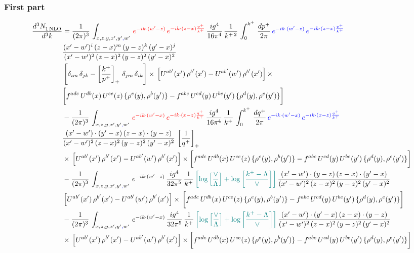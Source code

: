 \documentclass[9pt]{article}
\numberwithin{equation}{section}
\begin{document}
\subsubsection*{First part}
\begin{align}
     \frac{d^{3}N_{1\,\rm NLO}^{\rm}}{d^{3}k}  & = \frac{1}{(2\pi)^{3}}\, \int_{x,z,y,x',y'{\color{blue},}w'}\,{\color{red}e^{-ik\cdot (w^\prime-z)}\,e^{-ik\cdot (z-x)\frac{p^{+}}{k^{+}}}}\,\frac{ig^{4}}{16\pi^{4}}\, \frac{1}{k^{+\,2}}\,\int_{0}^{k^{+}}\, \frac{dp^{+}}{2\pi}\,{\color{blue}e^{-ik\cdot (w^\prime-z)}\,e^{-ik\cdot (z-x)\frac{p^{+}}{k^{+}}}}\notag \\ & \frac{(x'-w')^{i}\,(z-x)^{m}\,(y-z)^{k}\,(y'-x)^{j}}{(x'-w')^{2}\,(z-x)^{2}\,(y-z)^{2}\,(y'-x)^{2}}\,\notag \\ & \left[\delta_{im}\,\delta_{jk}-\left[\frac{k^{+}}{p^{+}}\right]_{+}\, \delta_{jm}\,\delta_{ik}\right]\times\, \left[U^{ab'}(x')\,\rho^{b'}(x')-U^{ab'}(w')\,\rho^{b'}(x')\right]\times\notag \\ & \bigg[f^{adc}\,U^{db}(x)\,U^{ce}(z)\, \{\rho^{e}(y),\rho^{b}(y')\}-f^{abc}\,U^{cd}(y)\,U^{be}(y')\, \{\rho^{d}(y),\rho^{e}(y')\}\bigg]\notag \\ & -\frac{1}{(2\pi)^{3}}\, \int_{x,z,y,x',y'{\color{blue},}w'}\,{\color{red}e^{-ik\cdot (w^\prime-x)}\,e^{-ik\cdot (x-z)\frac{q^{+}}{k^{+}}}}\,\frac{ig^{4}}{16\pi^{4}}\, \frac{1}{k^{+}}\,\int_{0}^{k^{+}}\, \frac{dq^{+}}{2\pi}\,{\color{blue}e^{-ik\cdot (w^\prime-x)}\,e^{-ik\cdot (x-z)\frac{q^{+}}{k^{+}}}}\notag \\ & \frac{(x'-w')\cdot (y'-x)\,(z-x)\cdot (y-z)}{(x'-w')^{2}\,(z-x)^{2}\,(y-z)^{2}\,(y'-x)^{2}}\,\left[\frac{1}{q^{+}}\right]_{+}\notag \\ & \times\, \left[U^{ab'}(x')\,\rho^{b'}(x')-U^{ab'}(w')\,\rho^{b'}(x')\right]\times \bigg[f^{adc}\,U^{db}(x)\,U^{ce}(z)\, \{\rho^{e}(y),\rho^{b}(y')\}-f^{abc}\,U^{cd}(y)\,U^{be}(y')\, \{\rho^{d}(y),\rho^{e}(y')\}\bigg]\notag \\ & -\frac{1}{(2\pi)^{3}}\, \int_{x,z,y,x',y'{\color{blue},}w'}\,e^{-ik\cdot (w^\prime-z)}\,\frac{ig^{4}}{32\pi^{5}}\, \frac{1}{k^{+}}\,{\color{teal}\left[\log{\left[\frac{\vee}{\Lambda}\right]} + \log{\left[\frac{k^{+}-\Lambda}{\vee}\right]}\right]}\,\frac{(x'-w')\cdot (y-z)\,(z-x)\cdot (y'-x)}{(x'-w')^{2}\,(z-x)^{2}\,(y-z)^{2}\,(y'-x)^{2}}\,\notag \\ & \left[U^{ab'}(x')\,\rho^{b'}(x')-U^{ab'}(w')\,\rho^{b'}(x')\right]\times\, \bigg[f^{adc}\,U^{db}(x)\,U^{ce}(z)\, \{\rho^{e}(y),\rho^{b}(y')\}-f^{abc}\,U^{cd}(y)\,U^{be}(y')\, \{\rho^{d}(y),\rho^{e}(y')\}\bigg]\notag \\ &  -\frac{1}{(2\pi)^{3}}\, \int_{x,z,y,x',y'{\color{blue},}w'}\,e^{-ik\cdot (w^\prime-x)}\,\frac{ig^{4}}{32\pi^{5}}\, \frac{1}{k^{+}}\,{\color{teal}\left[\log{\left[\frac{\vee}{\Lambda}\right]} + \log{\left[\frac{k^{+}-\Lambda}{\vee}\right]}\right]}\,\frac{(x'-w')\cdot (y'-x)\,(z-x)\cdot (y-z)}{(x'-w')^{2}\,(z-x)^{2}\,(y-z)^{2}\,(y'-x)^{2}}\notag \\ & \times\, \left[U^{ab'}(x')\,\rho^{b'}(x')-U^{ab'}(w')\,\rho^{b'}(x')\right]\times \bigg[f^{adc}\,U^{db}(x)\,U^{ce}(z)\, \{\rho^{e}(y),\rho^{b}(y')\}-f^{abc}\,U^{cd}(y)\,U^{be}(y')\, \{\rho^{d}(y),\rho^{e}(y')\}\bigg]
\end{align}
\end{document}
